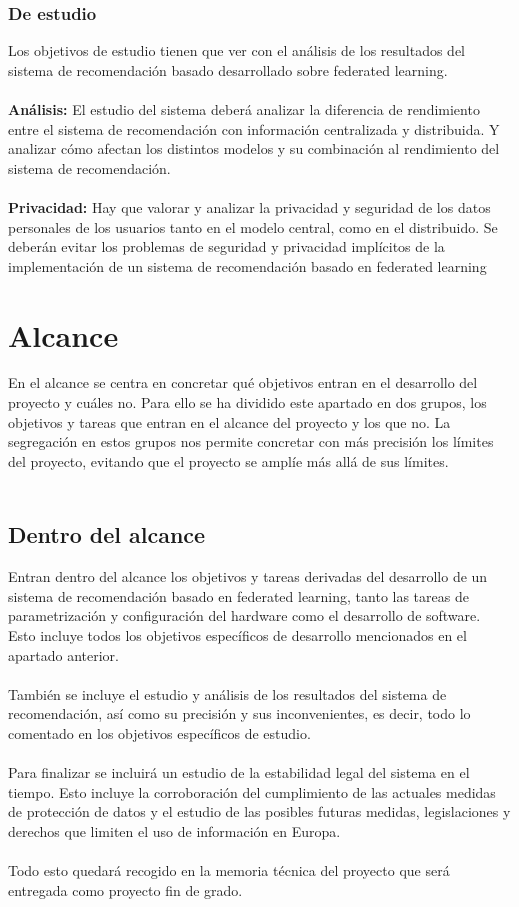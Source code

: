 \subsubsection{De estudio}
Los objetivos de estudio tienen que ver con el análisis de los resultados del sistema de recomendación basado desarrollado sobre federated learning.
\\ \\
\textbf{Análisis: }
El estudio del sistema deberá analizar la diferencia de rendimiento entre el sistema de recomendación con información centralizada y distribuida. Y analizar cómo afectan los distintos modelos y su combinación al rendimiento del sistema de recomendación.
\\ \\
\textbf{Privacidad: }
Hay que valorar y analizar la privacidad y seguridad de los datos personales de los usuarios tanto en el modelo central, como en el distribuido. Se deberán evitar los problemas de seguridad y privacidad implícitos de la implementación de un sistema de recomendación basado en federated learning

\section{Alcance}
En el alcance se centra en concretar qué objetivos entran en el desarrollo del proyecto y cuáles no. Para ello se ha dividido este apartado en dos grupos, los objetivos y tareas que entran en el alcance del proyecto y los que no. La segregación en estos grupos nos permite concretar con más precisión los límites del proyecto, evitando que el proyecto se amplíe más allá de sus límites. 
\\ \\
\subsection{Dentro del alcance}
Entran dentro del alcance los objetivos y tareas derivadas del desarrollo de un sistema de recomendación basado en federated learning, tanto las tareas de parametrización y configuración del hardware como el desarrollo de software. Esto incluye todos los objetivos específicos de desarrollo mencionados en el apartado anterior.
\\ \\
También se incluye el estudio y análisis de los resultados del sistema de recomendación, así como su precisión y sus inconvenientes, es decir, todo lo comentado en los objetivos específicos de estudio.
\\ \\
Para finalizar se incluirá un estudio de la estabilidad legal del sistema en el tiempo. Esto incluye la corroboración del cumplimiento de las actuales medidas de protección de datos y el estudio de las posibles futuras medidas, legislaciones y derechos que limiten el uso de información en Europa.
\\ \\
Todo esto quedará recogido en la memoria técnica del proyecto que será entregada como proyecto fin de grado.

